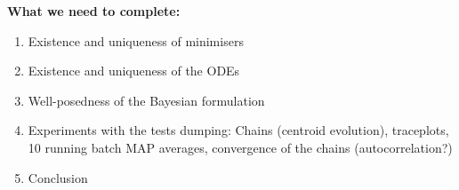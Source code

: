 \documentclass{article}
\begin{document}
\textbf{What we need to complete:}

\begin{enumerate}
\item Existence and uniqueness of minimisers
\item Existence and uniqueness of the ODEs
\item Well-posedness of the Bayesian formulation
\item Experiments with the tests dumping: Chains (centroid evolution),
traceplots, 10 running batch MAP averages, convergence of the chains
(autocorrelation?)
\item Conclusion
\end{enumerate}



\end{document}
